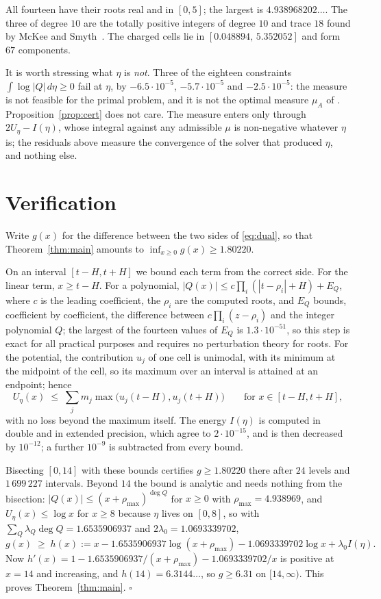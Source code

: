 \documentclass[11pt,a4paper]{article}
\begin{document}
All fourteen have their roots real and in $[0,5]$; the largest is
$4.938968202\ldots$. The three of degree $10$ are the totally positive integers
of degree $10$ and trace $18$ found by McKee and Smyth~\cite{MS}. The charged
cells lie in $[0.048894,\,5.352052]$ and form $67$ components.

It is worth stressing what $\eta$ is \emph{not}. Three of the eighteen
constraints $\int\log|Q|\,d\eta\ge 0$ fail at $\eta$, by $-6.5\cdot10^{-5}$,
$-5.7\cdot10^{-5}$ and $-2.5\cdot10^{-5}$: the measure is not feasible for the
primal problem, and it is not the optimal measure $\mu_A$ of \cite[Theorem
1.1]{OTS}. Proposition~\ref{prop:cert} does not care. The measure enters only
through $2U_\eta-I(\eta)$, whose integral against any admissible $\mu$ is
non-negative whatever $\eta$ is; the residuals above measure the convergence of
the solver that produced $\eta$, and nothing else.

\section{Verification}\label{sec:verif}

Write $g(x)$ for the difference between the two sides of \eqref{eq:dual}, so
that Theorem~\ref{thm:main} amounts to $\inf_{x\ge 0}g(x)\ge 1.80220$.

On an interval $[t-H,t+H]$ we bound each term from the correct side. For the
linear term, $x\ge t-H$. For a polynomial, $|Q(x)|\le
c\prod_i(|t-\rho_i|+H)+E_Q$, where $c$ is the leading coefficient, the $\rho_i$
are the computed roots, and $E_Q$ bounds, coefficient by coefficient, the
difference between $c\prod_i(z-\rho_i)$ and the integer polynomial $Q$; the
largest of the fourteen values of $E_Q$ is $1.3\cdot 10^{-51}$, so this step is
exact for all practical purposes and requires no perturbation theory for roots.
For the potential, the contribution $u_j$ of one cell is unimodal, with its
minimum at the midpoint of the cell, so its maximum over an interval is attained
at an endpoint; hence
\[
  U_\eta(x)\;\le\;\sum_j m_j\max\bigl(u_j(t-H),u_j(t+H)\bigr)
  \qquad\text{for } x\in[t-H,t+H],
\]
with no loss beyond the maximum itself. The energy $I(\eta)$ is computed in
double and in extended precision, which agree to $2\cdot10^{-15}$, and is then
decreased by $10^{-12}$; a further $10^{-9}$ is subtracted from every bound.

Bisecting $[0,14]$ with these bounds certifies $g\ge 1.80220$ there after $24$
levels and $1\,699\,227$ intervals. Beyond $14$ the bound is analytic and needs
nothing from the bisection: $|Q(x)|\le(x+\rho_{\max})^{\deg Q}$ for $x\ge0$ with
$\rho_{\max}=4.938969$, and $U_\eta(x)\le\log x$ for $x\ge8$ because $\eta$ lives
on $[0,8]$, so with $\sum_Q\lambda_Q\deg Q=1.6535906937$ and
$2\lambda_0=1.0693339702$,
\[
  g(x)\;\ge\;h(x):=x-1.6535906937\log(x+\rho_{\max})-1.0693339702\log x
  +\lambda_0 I(\eta).
\]
Now $h'(x)=1-1.6535906937/(x+\rho_{\max})-1.0693339702/x$ is positive at $x=14$
and increasing, and $h(14)=6.3144\ldots$, so $g\ge 6.31$ on $[14,\infty)$. This
proves Theorem~\ref{thm:main}. \hfill$\square$
\end{document}
